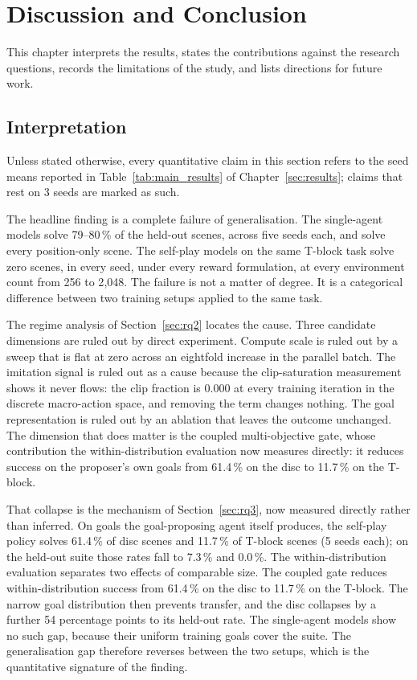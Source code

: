 \section{Discussion and Conclusion}
\label{sec:conclusion}


This chapter interprets the results, states the contributions against the
research questions, records the limitations of the study, and lists directions
for future work.

\subsection{Interpretation}
\label{sec:interpretation}

Unless stated otherwise, every quantitative claim in this section refers to the
seed means reported in Table~\ref{tab:main_results} of
Chapter~\ref{sec:results}; claims that rest on 3 seeds are marked as such.

The headline finding is a complete failure of generalisation. The single-agent
models solve 79--80\,\% of the held-out scenes, across five seeds each, and
solve every position-only scene. The self-play models on the same T-block task
solve zero scenes, in every seed, under every reward formulation, at every
environment count from 256 to 2{,}048. The failure is not a matter of degree. It
is a categorical difference between two training setups applied to the same
task.

The regime analysis of Section~\ref{sec:rq2} locates the cause. Three candidate
dimensions are ruled out by direct experiment. Compute scale is ruled out by a sweep
that is flat at zero across an eightfold increase in the parallel batch. The
imitation signal is ruled out as a cause because the clip-saturation measurement
shows it never flows: the clip fraction is 0.000 at every training iteration in
the discrete macro-action space, and removing the term changes nothing. The goal
representation is ruled out by an ablation that leaves the outcome unchanged.
The dimension that does matter is the coupled multi-objective gate, whose
contribution the within-distribution evaluation now measures directly: it reduces
success on the proposer's own goals from 61.4\,\% on the disc to 11.7\,\% on the
T-block.

That collapse is the mechanism of Section~\ref{sec:rq3}, now measured directly
rather than inferred. On goals the goal-proposing agent itself produces, the
self-play policy solves 61.4\,\% of disc scenes and 11.7\,\% of T-block scenes
(5 seeds each); on the held-out suite those rates fall to 7.3\,\% and 0.0\,\%.
The within-distribution evaluation separates two effects of comparable size. The
coupled gate reduces within-distribution success from 61.4\,\% on the disc to
11.7\,\% on the T-block. The narrow goal distribution then prevents transfer,
and the disc collapses by a further 54 percentage points to its held-out rate.
The single-agent models show no such gap, because their uniform training goals
cover the suite. The generalisation gap therefore reverses between the two
setups, which is the quantitative signature of the finding.

